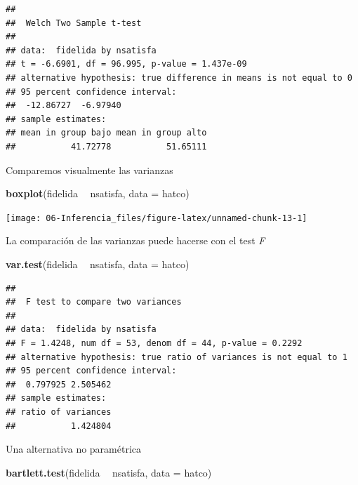 \documentclass[]{book}
\newenvironment{Shaded}{\begin{snugshade}}{\end{snugshade}}
\newcommand{\KeywordTok}[1]{\textcolor[rgb]{0.13,0.29,0.53}{\textbf{#1}}}
\newcommand{\DataTypeTok}[1]{\textcolor[rgb]{0.13,0.29,0.53}{#1}}
\newcommand{\StringTok}[1]{\textcolor[rgb]{0.31,0.60,0.02}{#1}}
\newcommand{\OperatorTok}[1]{\textcolor[rgb]{0.81,0.36,0.00}{\textbf{#1}}}
\newcommand{\NormalTok}[1]{#1}
\begin{document}
\begin{verbatim}
## 
##  Welch Two Sample t-test
## 
## data:  fidelida by nsatisfa
## t = -6.6901, df = 96.995, p-value = 1.437e-09
## alternative hypothesis: true difference in means is not equal to 0
## 95 percent confidence interval:
##  -12.86727  -6.97940
## sample estimates:
## mean in group bajo mean in group alto 
##           41.72778           51.65111
\end{verbatim}

Comparemos visualmente las varianzas

\begin{Shaded}
\begin{Highlighting}[]
\KeywordTok{boxplot}\NormalTok{(fidelida }\OperatorTok{~}\StringTok{ }\NormalTok{nsatisfa, }\DataTypeTok{data =}\NormalTok{ hatco)}
\end{Highlighting}
\end{Shaded}

\begin{center}\texttt{[image: 06-Inferencia\_files/figure-latex/unnamed-chunk-13-1]} \end{center}

La comparación de las varianzas puede hacerse con el test \emph{F}

\begin{Shaded}
\begin{Highlighting}[]
\KeywordTok{var.test}\NormalTok{(fidelida }\OperatorTok{~}\StringTok{ }\NormalTok{nsatisfa, }\DataTypeTok{data =}\NormalTok{ hatco)}
\end{Highlighting}
\end{Shaded}

\begin{verbatim}
## 
##  F test to compare two variances
## 
## data:  fidelida by nsatisfa
## F = 1.4248, num df = 53, denom df = 44, p-value = 0.2292
## alternative hypothesis: true ratio of variances is not equal to 1
## 95 percent confidence interval:
##  0.797925 2.505462
## sample estimates:
## ratio of variances 
##           1.424804
\end{verbatim}

Una alternativa no paramétrica

\begin{Shaded}
\begin{Highlighting}[]
\KeywordTok{bartlett.test}\NormalTok{(fidelida }\OperatorTok{~}\StringTok{ }\NormalTok{nsatisfa, }\DataTypeTok{data =}\NormalTok{ hatco)}
\end{Highlighting}
\end{Shaded}
\end{document}
